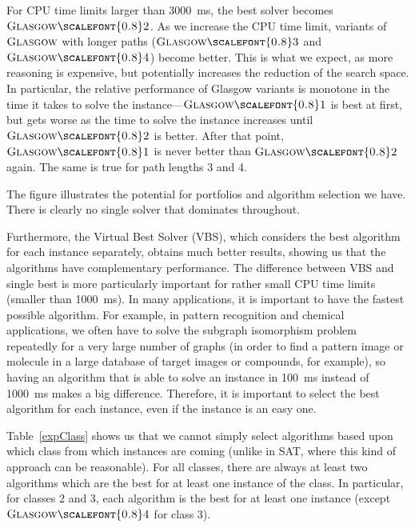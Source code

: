 \documentclass{llncs}
\newcommand{\Glasgow}{$\textsc{Glasgow}$\xspace}
\newcommand{\GlasgowOne}{$\textsc{Glasgow{\scalefont{0.8}1}}$\xspace}
\newcommand{\GlasgowTwo}{$\textsc{Glasgow{\scalefont{0.8}2}}$\xspace}
\newcommand{\GlasgowThree}{$\textsc{Glasgow{\scalefont{0.8}3}}$\xspace}
\newcommand{\GlasgowFour}{$\textsc{Glasgow{\scalefont{0.8}4}}$\xspace}
\begin{document}
For CPU time limits larger than \SI{3000}{\ms}, the best solver becomes \GlasgowTwo.  As we
increase the CPU time limit, variants of \Glasgow with longer paths (\GlasgowThree and \GlasgowFour)
become better. This is what we expect, as more reasoning is expensive, but potentially increases the
reduction of the search space. In particular, the relative performance of Glasgow variants is
monotone in the time it takes to solve the instance---\GlasgowOne is best at first, but gets worse as
the time to solve the instance increases until \GlasgowTwo is better. After that point, \GlasgowOne is
never better than \GlasgowTwo again. The same is true for path lengths 3 and 4.

The figure illustrates the potential for portfolios and algorithm selection we have. There is
clearly no single solver that dominates throughout.

Furthermore, the Virtual Best Solver (VBS), which considers the best algorithm for each instance
separately, obtains much better results, showing us that the algorithms have complementary
performance. The difference between VBS and single best is more particularly important for rather
small CPU time limits (smaller than \SI{1000}{\ms}). In many applications, it is important to have the
fastest possible algorithm. For example, in pattern recognition \cite{pr15,cviu11} and chemical
\cite{Giugno:2013} applications, we often have to solve the subgraph isomorphism problem repeatedly
for a very large number of graphs (in order to find a pattern image or molecule in a large database
of target images or compounds, for example), so having an algorithm that is able to solve an
instance in \SI{100}{\ms} instead of \SI{1000}{\ms} makes a big difference.  Therefore, it is important to select
the best algorithm for each instance, even if the instance is an easy one.

Table~\ref{expClass} shows us that we cannot simply select algorithms based upon which class from
which instances are coming (unlike in SAT, where this kind of approach can be reasonable). For all
classes, there are always at least two algorithms which are the best for at least one instance of
the class. In particular, for classes 2 and 3, each algorithm is the best for at least one instance
(except \GlasgowFour for class 3).
\end{document}

